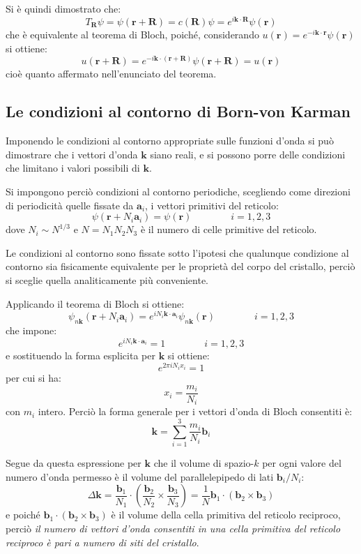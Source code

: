 Si è quindi dimostrato che:
\[ T_{\textbf{R}} \psi = \psi(\textbf{r} + \textbf{R}) = c(\textbf{R})\psi = e^{i\textbf{k}\cdot\textbf{R}}\psi(\textbf{r}) \]
che è equivalente al teorema di Bloch, poiché, considerando $ u(\textbf{r}) = e^{-i\textbf{k}\cdot\textbf{r}}\psi(\textbf{r}) $ si ottiene:
\[ u(\textbf{r} + \textbf{R}) = e^{-i\textbf{k}\cdot(\textbf{r} + \textbf{R})}\psi(\textbf{r} + \textbf{R}) = u(\textbf{r}) \]
cioè quanto affermato nell'enunciato del teorema.

\subsection{Le condizioni al contorno di Born-von Karman}

Imponendo le condizioni al contorno appropriate sulle funzioni d'onda si può dimostrare che i vettori d'onda $ \textbf{k} $ siano reali, e si possono porre delle condizioni che limitano i valori possibili di $ \textbf{k} $.

Si impongono perciò condizioni al contorno periodiche, scegliendo come direzioni di periodicità quelle fissate da $ \textbf{a}_i $, i vettori primitivi del reticolo:
\[ \psi(\textbf{r} + N_i \textbf{a}_i) = \psi(\textbf{r})	\qquad	\qquad	i = 1,2,3 \]
dove $ N_i \sim N^{1/3} $ e $ N = N_1 N_2 N_3 $ è il numero di celle primitive del reticolo.

Le condizioni al contorno sono fissate sotto l'ipotesi che qualunque condizione al contorno sia fisicamente equivalente per le proprietà del corpo del cristallo, perciò si sceglie quella analiticamente più conveniente.

Applicando il teorema di Bloch si ottiene:
\[ \psi_{n\textbf{k}}(\textbf{r} + N_i \textbf{a}_i) = e^{iN_i\textbf{k}\cdot\textbf{a}_i}\psi_{n\textbf{k}}(\textbf{r})	\qquad	\qquad i=1,2,3\]
che impone:
\[ e^{iN_i\textbf{k}\cdot\textbf{a}_i} = 1	\qquad	\qquad i=1,2,3 \]
e sostituendo la forma esplicita per $ \textbf{k} $ si ottiene:
\[ e^{2\pi i N_i x_i} = 1 \]
per cui si ha:
\[ x_i = \frac{m_i}{N_i} \]
con $ m_i $ intero. Perciò la forma generale per i vettori d'onda di Bloch consentiti è:
\[ \textbf{k} = \sum_{i = 1}^{3} \frac{m_i}{N_i} \textbf{b}_i \]

Segue da questa espressione per $ \textbf{k} $ che il volume di spazio-$ k $ per ogni valore del numero d'onda permesso è il volume del parallelepipedo di lati $ \textbf{b}_i/N_i $:
\[ \Delta\textbf{k} = \frac{\textbf{b}_1}{N_1} \cdot (\frac{\textbf{b}_2}{N_2} \times \frac{\textbf{b}_3}{N_3}) = \frac{1}{N} \textbf{b}_1 \cdot (\textbf{b}_2 \times \textbf{b}_3) \]
e poiché $ \textbf{b}_1 \cdot (\textbf{b}_2 \times \textbf{b}_3) $ è il volume della cella primitiva del reticolo reciproco, perciò \textit{il numero di vettori d'onda consentiti in una cella primitiva del reticolo reciproco è pari a numero di siti del cristallo}.

